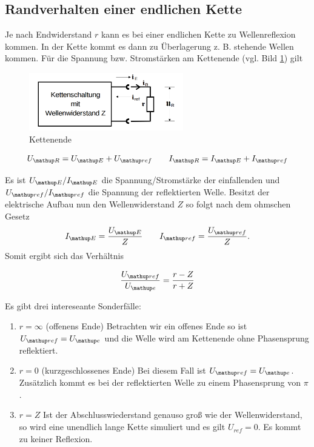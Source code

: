 \subsection{Randverhalten einer endlichen Kette}
Je nach Endwiderstand $r$ kann es bei einer endlichen Kette 
zu Wellenreflexion kommen. In der Kette kommt es dann
zu Überlagerung z. B. stehende Wellen kommen.
Für die Spannung bzw. Stromstärken am Kettenende (vgl. Bild \ref{fig:kettenende}) gilt

\begin{figure}
  \centering
  \includegraphics[width=0.6\textwidth]{bilder/wellenwiderstand.png}
  \caption{Kettenende}
  \label{fig:kettenende}
\end{figure}

\begin{equation*}
U\ua{R}=U\ua{E}+U\ua{ref} \qquad I\ua{R}=I\ua{E}+I\ua{ref}
\end{equation*}

Es ist $U\ua{E}/I\ua{E}$ die Spannung/Stromstärke der einfallenden und $U\ua{ref}/I\ua{ref}$ die Spannung der reflektierten 
Welle. Besitzt der elektrische Aufbau nun den Wellenwiderstand $Z$ so folgt nach dem
ohmschen Gesetz
\begin{equation*}
I\ua{E}=\frac{U\ua{E}}{Z} \qquad I\ua{ref}=\frac{U\ua{ref}}{Z}.
\end{equation*}
Somit ergibt sich das Verhältnis

\begin{equation*}
\frac{U\ua{ref}}{U\ua{e}}=\frac{r-Z}{r+Z}
\end{equation*}

Es gibt drei intereseante Sonderfälle:

\renewcommand{\labelenumi}{\alph{enumi})}
\begin{enumerate}
\item{ $r=\infty$ (offenens Ende) \newline
Betrachten wir ein offenes Ende so ist $U\ua{ref}=U\ua{e}$ und die Welle wird am Kettenende ohne Phasensprung reflektiert.}
\item{ $r=0$ (kurzgeschlossenes Ende) \newline
Bei diesem Fall ist $U\ua{ref}=U\ua{e}$. Zusätzlich kommt es bei der reflektierten Welle zu einem Phasensprung von $\pi$.}
\item{ $r=Z$ \newline
Ist der Abschlusswiederstand genauso groß wie der Wellenwiderstand, so wird eine unendlich lange Kette simuliert und 
es gilt $U_{ref}=0$. Es kommt zu keiner Reflexion.}
\end{enumerate}

